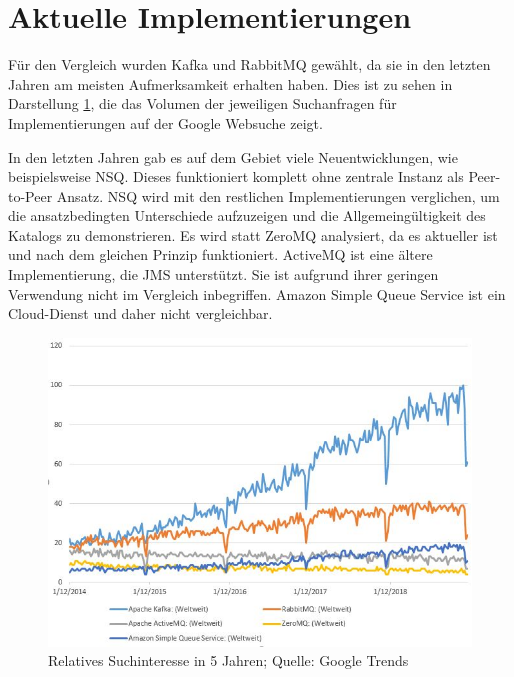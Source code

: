 \label{comparison:implementations}
\section{Aktuelle Implementierungen}
Für den Vergleich wurden Kafka und RabbitMQ gewählt, da sie in den letzten
Jahren am meisten Aufmerksamkeit erhalten haben. Dies ist zu sehen in
Darstellung \ref{searchinterest}, die das Volumen der jeweiligen
Suchanfragen für Implementierungen auf der Google Websuche zeigt.

In den letzten Jahren gab es auf dem Gebiet viele Neuentwicklungen, wie
beispielsweise NSQ. Dieses funktioniert komplett ohne zentrale Instanz als
Peer-to-Peer Ansatz. NSQ wird mit den restlichen Implementierungen verglichen,
um die ansatzbedingten Unterschiede aufzuzeigen und die Allgemeingültigkeit des
Katalogs zu demonstrieren. Es wird statt ZeroMQ analysiert, da es aktueller
ist und nach dem gleichen Prinzip funktioniert.
ActiveMQ ist eine ältere Implementierung, die JMS unterstützt. Sie ist aufgrund
ihrer geringen Verwendung nicht im Vergleich inbegriffen.
Amazon Simple Queue Service ist ein Cloud-Dienst und daher nicht vergleichbar.

\begin{figure}
	\centering
	\includegraphics[width=.8\textwidth]{figures/searchinterest.JPG}
	\caption{Relatives Suchinteresse in 5 Jahren; Quelle: Google Trends}
	\label{searchinterest}
\end{figure}
